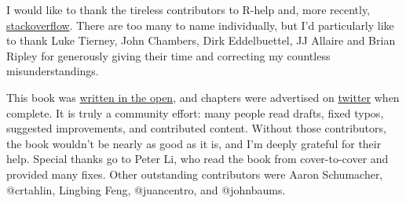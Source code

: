 I would like to thank the tireless contributors to R-help and, more
recently,
\href{http://stackoverflow.com/questions/tagged/r}{stackoverflow}. There
are too many to name individually, but I'd particularly like to thank
Luke Tierney, John Chambers, Dirk Eddelbuettel, JJ Allaire and Brian
Ripley for generously giving their time and correcting my countless
misunderstandings.

This book was \href{https://github.com/hadley/adv-r/}{written in the
open}, and chapters were advertised on
\href{https://twitter.com/hadleywickham}{twitter} when complete. It is
truly a community effort: many people read drafts, fixed typos,
suggested improvements, and contributed content. Without those
contributors, the book wouldn't be nearly as good as it is, and I'm
deeply grateful for their help. Special thanks go to Peter Li, who read
the book from cover-to-cover and provided many fixes. Other outstanding
contributors were Aaron Schumacher, @crtahlin, Lingbing Feng,
@juancentro, and @johnbaums. 

